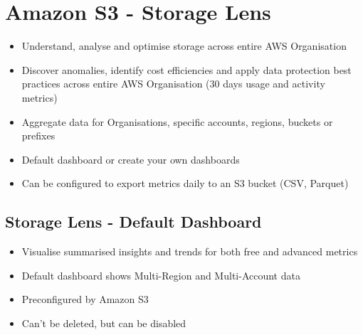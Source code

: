 \section{Amazon S3 - Storage Lens}
\begin{itemize}
    \item Understand, analyse and optimise storage across entire AWS Organisation
    \item Discover anomalies, identify cost efficiencies and apply data protection best practices across entire AWS Organisation (30 days usage and activity metrics)
    \item Aggregate data for Organisations, specific accounts, regions, buckets or prefixes
    \item Default dashboard or create your own dashboards
    \item Can be configured to export metrics daily to an S3 bucket (CSV, Parquet)
\end{itemize}

\subsection{Storage Lens - Default Dashboard}
\begin{itemize}
    \item Visualise summarised insights and trends for both free and advanced metrics
    \item Default dashboard shows Multi-Region and Multi-Account data
    \item Preconfigured by Amazon S3
    \item Can't be deleted, but can be disabled
\end{itemize}

